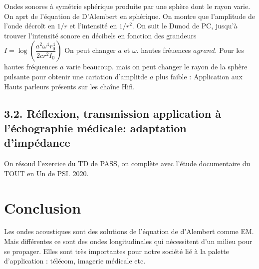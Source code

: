 \documentclass[french, a4paper, 10pt, twocolumn, landscape]{article}
\begin{document}
Ondes sonores à symétrie sphérique produite par une sphère dont le rayon varie. On aprt de l'équation de D'Alembert en sphérique. On montre que l'amplitude de l'onde décroît en $1/r$ et l'intensité en $1/r^2$. On suit le Dunod de PC, jusqu'à trouver l'intensité sonore en décibels en fonction des grandeurs $I=\log\left(\dfrac{a^2\omega^4r_0^4}{2cr^2I_0}\right)$ On peut changer $a$ et $\omega$. hautes fréuences $a grand$. Pour les hautes fréquences $a$ varie beaucoup. mais on peut changer le rayon de la sphère pulsante pour obtenir une cariation d'amplitde $a$ plus faible : Application aux Hauts parleurs présents sur les chaîne Hifi. 

\subsection*{3.2. Réflexion, transmission application à l'échographie médicale: adaptation d'impédance} 

On résoud l'exercice du TD de PASS, on complète avec l'étude documentaire du TOUT en Un de PSI. 2020. 

\section*{Conclusion}

Les ondes acoustiques sont des solutions de l'équation de d'Alembert comme EM. Mais différentes ce sont des ondes longitudinales qui nécessitent d'un milieu pour se propager. Elles sont très importantes pour notre société lié à la palette d'application : télécom, imagerie médicale etc.
\end{document}
